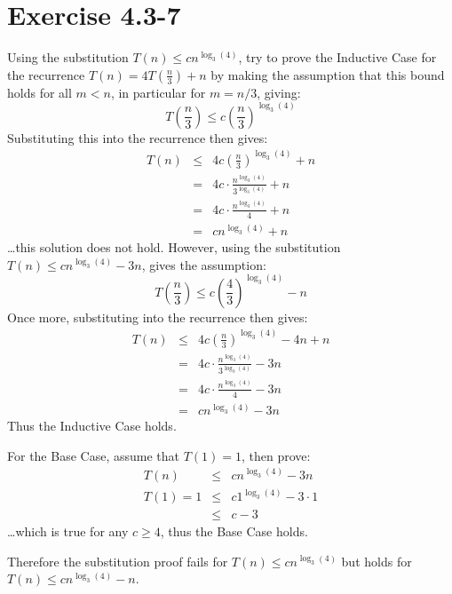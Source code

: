 \documentclass{article}
\begin{document}
\section*{Exercise 4.3-7}

Using the substitution $T(n) \leq cn^{\log_3(4)}$, try to prove the Inductive Case for the recurrence $T(n) = 4T(\frac{n}{3}) + n$ by making the assumption that this bound holds for all $m < n$, in particular for $m = n/3$, giving:
\begin{equation*}
	T\left(\frac{n}{3}\right) \leq c\left(\frac{n}{3}\right)^{\log_3(4)}
\end{equation*}
Substituting this into the recurrence then gives:
\begin{eqnarray*}
	T(n) &\leq& 4c\left(\frac{n}{3}\right)^{\log_3(4)} + n \\
	 &=& 4c \cdot \frac{n^{\log_3(4)}}{3^{\log_3(4)}} + n \\
	 &=& 4c \cdot \frac{n^{\log_3(4)}}{4} + n \\
	 &=& cn^{\log_3(4)} + n
\end{eqnarray*}
\ldots this solution does not hold. However, using the substitution $T(n) \leq cn^{\log_3(4)} - 3n$, gives the assumption:
\begin{equation*}
	T\left(\frac{n}{3}\right) \leq c\left(\frac{4}{3}\right)^{\log_3(4)} - n
\end{equation*}
Once more, substituting into the recurrence then gives:
\begin{eqnarray*}
	T(n) &\leq& 4c\left(\frac{n}{3}\right)^{\log_3(4)} - 4n + n \\
	 &=& 4c \cdot \frac{n^{\log_3(4)}}{3^{\log_3(4)}} - 3n \\
	 &=& 4c \cdot \frac{n^{\log_3(4)}}{4} - 3n \\
	 &=& cn^{\log_3(4)} - 3n
\end{eqnarray*}
Thus the Inductive Case holds.

For the Base Case, assume that $T(1) = 1$, then prove:
\begin{eqnarray*}
	T(n) &\leq& cn^{\log_3(4)} - 3n \\
	T(1) = 1 &\leq& c1^{\log_3(4)} - 3\cdot1 \\
	 &\leq& c - 3
\end{eqnarray*}
\ldots which is true for any $c \geq 4$, thus the Base Case holds.

Therefore the substitution proof fails for $T(n) \leq cn^{\log_3(4)}$ but holds for $T(n) \leq cn^{\log_3(4)} - n$.
\end{document}
